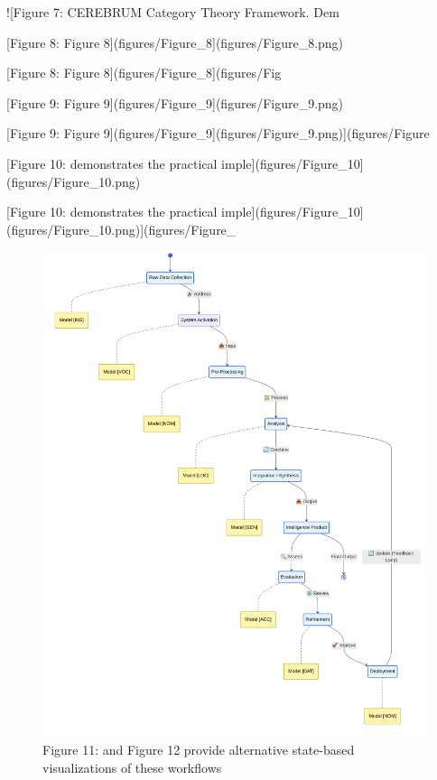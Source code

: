 \documentclass[
  11pt,
  letterpaper,
]{article}
\begin{document}
!{[}Figure 7: CEREBRUM Category Theory Framework. Dem

{[}Figure 8: Figure 8{]}(figures/Figure\_8{]}(figures/Figure\_8.png)

{[}Figure 8: Figure 8{]}(figures/Figure\_8{]}(figures/Fig

{[}Figure 9: Figure 9{]}(figures/Figure\_9{]}(figures/Figure\_9.png)

{[}Figure 9: Figure
9{]}(figures/Figure\_9{]}(figures/Figure\_9.png){]}(figures/Figure

{[}Figure 10: demonstrates the practical
imple{]}(figures/Figure\_10{]}(figures/Figure\_10.png)

{[}Figure 10: demonstrates the practical
imple{]}(figures/Figure\_10{]}(figures/Figure\_10.png){]}(figures/Figure\_

\begin{figure}
\centering
\includegraphics{figures/Figure_11.png}
\caption{Figure 11: and Figure 12 provide alternative state-based
visualizations of these workflows}
\end{figure}
\end{document}
